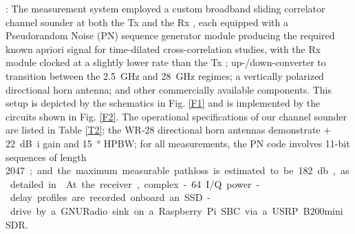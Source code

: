 \documentclass[10pt, twocolumn]{IEEEtran}
\begin{document}
: The measurement system employed a custom broadband sliding correlator channel sounder at both the Tx and the Rx \cite{Purdue}, each equipped with a Pseudorandom Noise (PN) sequence generator module producing the required known apriori signal for time-dilated cross-correlation studies, with the Rx module clocked at a slightly lower rate than the Tx \cite{Sounder}; up-/down-converter to transition between the \SI{2.5}{\giga\hertz} and \SI{28}{\giga\hertz} regimes; a vertically polarized directional horn antenna; and other commercially available components. This setup is depicted by the schematics in Fig. \ref{F1} and is implemented by the circuits shown in Fig. \ref{F2}. The operational specifications of our channel sounder are listed in Table \ref{T2}: the WR-$28$ directional horn antennas demonstrate $+$\SI{22}{\deci\bel{i}} gain and \SI{15}{\degree} HPBW; for all measurements, the PN code involves \SI{11}{}-bit sequences of length \SI{2047}; and the maximum measurable pathloss is estimated to be \SI{182}{\decibel}, as detailed in \cite{Purdue}. At the receiver, complex-\SI{64}{} I/Q power-delay profiles are recorded onboard an SSD-drive by a GNURadio sink on a Raspberry Pi SBC via a USRP B$200$mini SDR.
\end{document}
